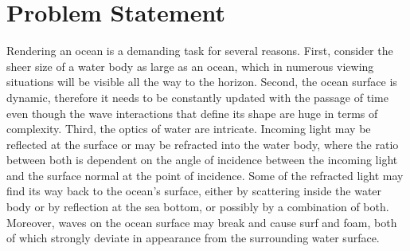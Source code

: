 \section{Problem Statement}
\label{sec:problem_statement}
%
Rendering an ocean is a demanding task for several reasons. First, consider the
sheer size of a water body as large as an ocean, which in numerous viewing
situations will be visible all the way to the horizon. Second, the ocean surface
is dynamic, therefore it needs to be constantly updated with the passage of time
even though the wave interactions that define its shape are huge in terms of complexity.
Third, the optics of water are intricate. Incoming light may be reflected at the
surface or may be refracted into the water body, where the ratio between both is
dependent on the angle of incidence between the incoming light and the surface
normal at the point of incidence. Some of the refracted light may find its way
back to the ocean's surface, either by scattering inside the water body or by
reflection at the sea bottom, or possibly by a combination of both. Moreover,
waves on the ocean surface may break and cause surf and foam,
both of which strongly deviate in appearance from the surrounding water surface.
%
%
%
%
% 
% 
